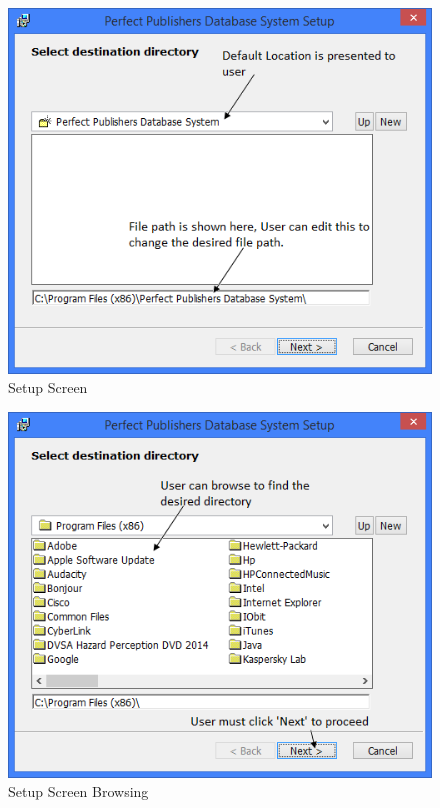 \begin{figure}[H]
    \includegraphics[width=\textwidth]{./Manual/Installation/Setup.png}
    \caption{Setup Screen}
\end{figure}

\begin{figure}[H]
    \includegraphics[width=\textwidth]{./Manual/Installation/Setup2.png}
    \caption{Setup Screen Browsing}
\end{figure}

